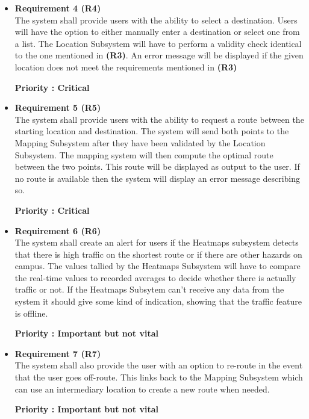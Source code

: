 \documentclass[english]{article}
\begin{document}
\begin{itemize}
					    \item \textbf{Requirement 4 (R4)}\\ The system shall provide users with the ability to select a destination. Users will have the option to either manually enter a destination or select one from a list. The Location Subsystem will have to perform a validity check identical to the one mentioned in \textbf{(R3)}.  An error message will be displayed if the given location does not meet the requirements mentioned in \textbf{(R3)} \\ 
						\begin{small}
						\textbf{Priority : Critical}
						\end{small}											    
					    

					    \item \textbf{Requirement 5 (R5)}\\ The system shall provide users with the ability to request a route between the starting location and destination. The system will send both points to the Mapping Subsystem after they have been validated by the Location Subsystem. The mapping system will then compute the optimal route between the two points. This route will be displayed as output to the user. If no route is available then the system will display an error message describing so.\\ 
						\begin{small}
						\textbf{Priority : Critical}
						\end{small}											    
					    

					    \item \textbf{Requirement 6 (R6)}\\ The system shall create an alert for users if the Heatmaps subsystem detects that there is high traffic on the shortest route or if there are other hazards on campus. The values tallied by the Heatmaps Subsystem will have to compare the real-time values to recorded averages to decide whether there is actually traffic or not. If the Heatmaps Subsytem can't receive any data from the system it should give some kind of indication, showing that the traffic feature is offline. \\
						\begin{small}
											    \textbf{Priority : Important but not vital}
						\end{small}					    


					    \item \textbf{Requirement 7 (R7)}\\ The system shall also provide the user with an option to re-route in the event that the user goes off-route. This links back to the Mapping Subsystem which can use an intermediary location to create a new route when needed.\\  
						\begin{small}
						    \textbf{Priority : Important but not vital}						
						\end{small}											    



\end{itemize}
\end{document}
